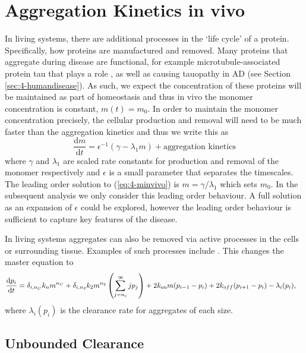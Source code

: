 \section{Aggregation Kinetics in vivo}

In living systems, there are additional processes in the `life cycle' of a protein. Specifically, how proteins are manufactured and removed. Many proteins that aggregate during disease are functional, for example microtubule-associated protein tau that plays a role , as well as causing tauopathy in AD (see Section \ref{sec:4-humandisease}). As such, we expect the concentration of these proteins will be maintained as part of homeostasis and thus in vivo the monomer concentration is constant, $m(t)=m_0$. In order to maintain the monomer concentration precisely, the cellular production and removal will need to be much faster than the aggregation kinetics and thus we write this as
\begin{equation}
    \frac{\text{d}m}{\text{d}t} = \epsilon^{-1}\left( \gamma - \lambda_1 m \right) + \text{aggregation kinetics}
    \label{eq:4-minvivo}
\end{equation}
where $\gamma$ and $\lambda_1$ are scaled rate constants for production and removal of the monomer respectively and $\epsilon$ is a small parameter that separates the timescales. The leading order solution to (\ref{eq:4-minvivo}) is $m=\gamma/\lambda_1$ which sets $m_0$. In the subsequent analysis we only consider this leading order behaviour. A full solution as an expansion of $\epsilon$ could be explored, however the leading order behaviour is sufficient to capture key features of the disease.

In living systems aggregates can also be removed via active processes in the cells or surrounding tissue. Examples of such processes include . This changes the master equation to
\begin{equation}
\begin{split}
    \frac{\text{d}p_i}{\text{d}t} &= \delta_{i, n_C}k_n m^{n_C} + \delta_{i, n_2} k_2 m^{n_2} \left(\sum_{j=n_{\mathrm{c}}}^{\infty} j p_j\right) + 2k_\text{on} m (p_{i-1}-p_i) + 2k_{off} (p_{i+1}-p_i) - \lambda_i(p_i),
    \end{split}
    \label{eq:4-pi_cleared}
\end{equation}
where $\lambda_i(p_i)$ is the clearance rate for aggregates of each size.

\subsection{Unbounded Clearance}

